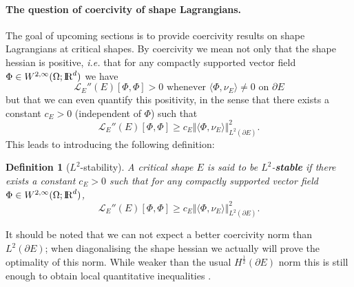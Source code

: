 \documentclass{article}
\newcommand{\R}{\textnormal{I\kern-0.21emR}}
\renewcommand{\geq}{\geqslant}
\newtheorem{definition}[material]{Definition}
\def\O{{\Omega}}
\numberwithin{equation}{section}
\begin{document}
\paragraph{The question of coercivity of shape Lagrangians.} The goal of upcoming sections is to provide coercivity results on shape Lagrangians at critical shapes. By coercivity we mean not only that the shape hessian is positive, \emph{i.e.} that for any compactly supported vector field $\Phi\in W^{2,\infty}(\O;\R^d)$ we have 
\[ \mathscr L_E''(E)[\Phi,\Phi]>0\text{ whenever }\langle \Phi,\nu_E\rangle\neq 0\text{ on }\partial E\] but  that we can even quantify this positivity, in the sense that there exists a constant $c_E>0$ (independent of $\Phi$) such that 
\[ \mathscr L_E''(E)[\Phi,\Phi]\geq c_E \Vert \langle \Phi,\nu_E\rangle \Vert_{L^2(\partial E)}^2.\]
This leads to introducing the following definition:
\begin{definition}[$L^2$-stability]\label{De:StableShape}
A critical shape $E$ is said to be $L^2$-\textbf{stable} if there exists a constant $c_E>0$ such that
 for any compactly supported vector field $\Phi\in W^{2,\infty}(\O;\R^d)$, 
\[ \mathscr L_E''(E)[\Phi,\Phi]\geq  c_E\Vert \langle \Phi,\nu_E\rangle\Vert_{L^2(\partial E)}^2.\]
\end{definition}

It should be noted that we can not expect a better coercivity norm than $L^2(\partial E)$; when diagonalising the shape hessian we actually will prove the optimality of this norm. While weaker than the usual $H^{\frac12}(\partial E)$ norm \cite{DambrineLamboley,DambrinePierre,henrotpierrerihani} this is still enough to obtain local quantitative inequalities \cite{MRB2020}. 
\end{document}
